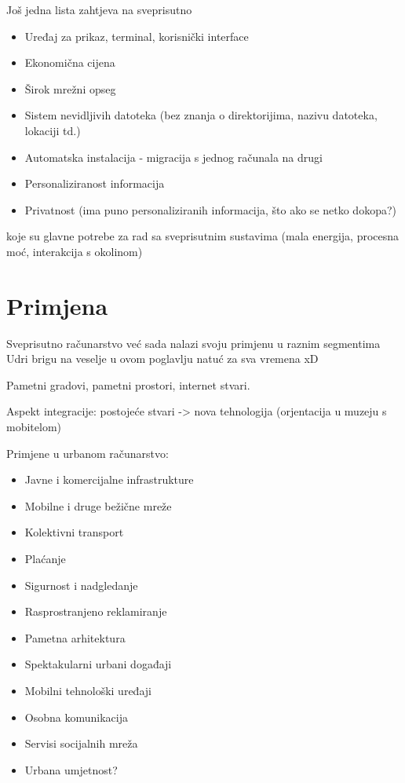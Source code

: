 \documentclass[times, utf8, diplomski, numeric]{fer}
\begin{document}
Još jedna lista zahtjeva na sveprisutno
\begin{itemize}
  \item Uređaj za prikaz, terminal, korisnički interface
  \item Ekonomična cijena
  \item Širok mrežni opseg
  \item Sistem nevidljivih datoteka (bez znanja o direktorijima, nazivu
  datoteka, lokaciji td.)
  \item Automatska instalacija - migracija s jednog računala na drugi
  \item Personaliziranost informacija
  \item Privatnost (ima puno personaliziranih informacija, što ako se netko
  dokopa?)
\end{itemize}

koje su glavne potrebe za rad sa sveprisutnim sustavima (mala energija,
procesna moć, interakcija s okolinom)

\section{Primjena}

Sveprisutno računarstvo već sada nalazi svoju primjenu u raznim segmentima 
Udri brigu na veselje u ovom poglavlju natuć za sva vremena xD

Pametni gradovi, pametni prostori, internet stvari.

Aspekt integracije: postojeće stvari -> nova tehnologija (orjentacija u muzeju
s mobitelom)

Primjene u urbanom računarstvo:
\begin{itemize}
  \item Javne i komercijalne infrastrukture
  \item Mobilne i druge bežične mreže
  \item Kolektivni transport
  \item Plaćanje
  \item Sigurnost i nadgledanje
  \item Rasprostranjeno reklamiranje
  \item Pametna arhitektura
  \item Spektakularni urbani događaji
  \item Mobilni tehnološki uređaji
  \item Osobna komunikacija
  \item Servisi socijalnih mreža
  \item Urbana umjetnost?
\end{itemize}
\end{document}
